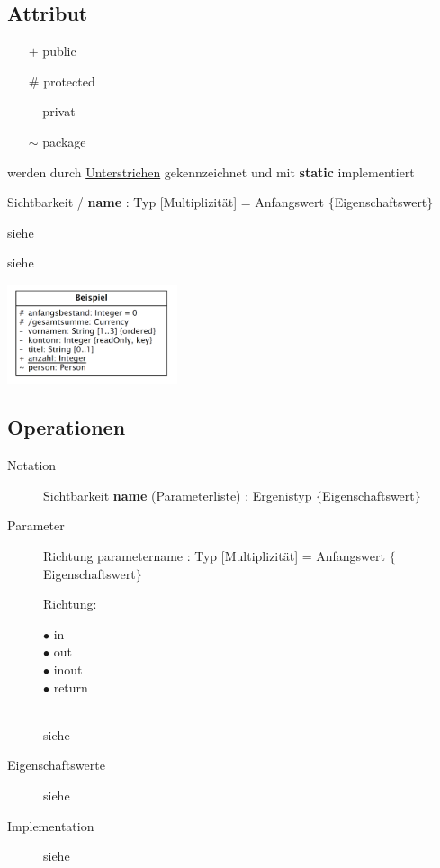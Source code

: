 \subsection{Attribut }
  \begin{description}
    \item[Sichtbarkeit]
      \begin{itemize}[leftmargin=0.5cm]
        \item[$+$] public
        \item[$\#$] protected
        \item[$-$] privat
        \item[$\sim$] package
      \end{itemize}
    \item[Klassenattribute]
      werden durch \underline{Unterstrichen} gekennzeichnet und mit \textbf{static} implementiert
    \item[Notation]
      Sichtbarkeit / \textbf{name} : Typ [Multiplizität] = Anfangswert $\lbrace$Eigenschaftswert$\rbrace$ \\
    \parbox{6cm}{
      \item[Eigenschaftswerte]
        siehe 
      \item[Implementation]
        siehe  }
    \parbox{6cm}{\includegraphics[width=5cm]{./bilder/Notation_Attribute.png}}
  \end{description}
  
  
\subsection{Operationen }
  \begin{description}
    \item[Notation]
      Sichtbarkeit \textbf{name} (Parameterliste) : Ergenistyp $\lbrace$Eigenschaftswert$\rbrace$
    \item[Parameter]
      Richtung parametername : Typ [Multiplizität] = Anfangswert $\lbrace$Eigenschaftswert$\rbrace$ \\
      \parbox[t]{2cm}{Richtung: }
      \parbox[t]{2cm}{$\bullet$ in \\ $\bullet$ out \\ $\bullet$ inout \\ $\bullet$ return} \\
      siehe 
    \item[Eigenschaftswerte]
      siehe 
    \item[Implementation]
      siehe 
  \end{description}
  
